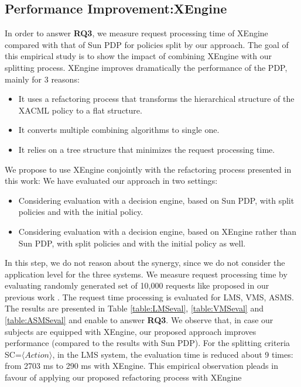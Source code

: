 \subsection{Performance Improvement:XEngine}
In order to answer \textbf{RQ3}, we measure request processing time of XEngine compared with that of Sun PDP
for policies split by our approach.
The goal of this empirical study is to show the impact of combining
XEngine with our splitting process. XEngine improves dramatically the performance of the PDP, mainly for
3 reasons:
\begin{itemize}
\item It uses a refactoring process that transforms the hierarchical structure of the XACML policy to a flat structure.
\item  It converts multiple combining algorithms to single one.
\item  It relies on a tree structure that minimizes the request
processing time.
\end{itemize}
We propose to use XEngine conjointly with the refactoring
process presented in this work: We have evaluated our
approach in two settings:
\begin{itemize}
\item  Considering evaluation with a decision engine, based
on Sun PDP, with split policies and with the initial policy.
\item Considering evaluation with a decision engine, based
on XEngine rather than Sun PDP, with split policies
and with the initial policy as well.
\end{itemize}

In this step, we do not reason about the synergy, since we do not consider the application level for the three systems.
We measure request processing time by evaluating randomly
generated set of 10,000 requests like proposed in our previous work \cite{request}.
The request time processing is evaluated for LMS, VMS, ASMS. The results
are presented in Table \ref{table:LMSeval}, \ref{table:VMSeval} and \ref{table:ASMSeval} and enable to answer \textbf{RQ3}.
We observe that, in case our subjects are equipped with XEngine, our proposed approach 
improves performance (compared to the results with Sun PDP). For the splitting criteria SC=$\langle Action \rangle$,
in the LMS system, the evaluation time is reduced about 9 times: from 2703 ms to 290 ms with XEngine. This empirical 
observation pleads in favour of applying our proposed refactoring process with XEngine 

